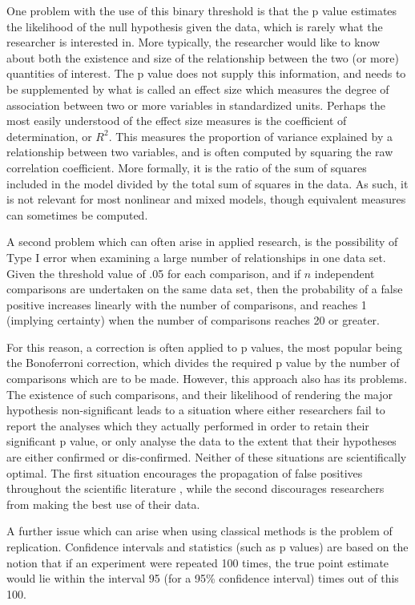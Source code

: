 One problem with the use of this binary threshold is that the p value estimates the likelihood of the null hypothesis given the data, which is rarely what the researcher is interested in. More typically, the researcher would like to know about both the existence and size of the relationship between the two (or more) quantities of interest\cite{cohen1988statistical}. The p value does not supply this information, and needs to be supplemented by what is called an effect size which measures the degree of association between two or more variables in standardized units. Perhaps the most easily understood of the effect size measures is the coefficient of determination, or $R^2$.  
This measures the proportion of variance explained by a relationship between two variables, and is often computed by squaring the raw correlation coefficient. More formally, it is the ratio of the sum of squares included in the model divided by the total sum of squares in the data. As such, it is not relevant for most nonlinear and mixed models, though equivalent measures can sometimes be computed\cite{gelman2007data}.  

A second problem which can often arise in applied research, is the possibility of Type I error when examining a large number of relationships in one data set. Given the threshold value of .05 for each comparison, and if $n$ independent comparisons are undertaken on the same data set, then the probability of a false positive increases linearly with the number of comparisons, and reaches 1 (implying certainty) when the number of comparisons reaches 20 or greater. 

For this reason, a correction is often applied to p values, the most popular being the Bonoferroni correction, which divides the required p value by the number of comparisons which are to be made. However, this approach also has its problems. The existence of such comparisons, and their likelihood of rendering the major hypothesis non-significant leads to a situation where either researchers fail to report the analyses which they actually performed in order to retain their significant p value, or only analyse the data to the extent that their hypotheses are either confirmed or dis-confirmed. 
Neither of these situations are scientifically optimal. The first situation encourages the propagation of false positives throughout the scientific literature \cite{ioannidis2005most}, while the second discourages researchers from making the best use of their data. 

A further issue which can arise when using classical methods is the problem of replication. Confidence intervals and statistics (such as p values) are based on the notion that if an experiment were repeated 100 times, the true point estimate would lie within the interval 95 (for a 95\% confidence interval) times out of this 100. 

